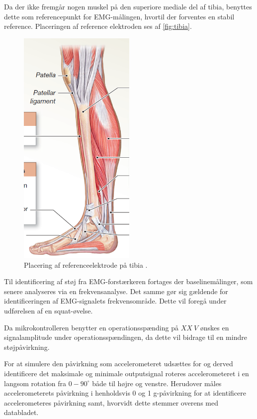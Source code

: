 Da der ikke fremgår nogen muskel på den superiore mediale del af tibia, benyttes dette som referencepunkt for EMG-målingen, hvortil der forventes en stabil reference. Placeringen af reference elektroden ses af \autoref{fig:tibia}.

\begin{figure}[H]
\centering
\includegraphics[width=0.5\textwidth]{figures/tibia.png}
\caption{Placering af referenceelektrode på tibia \citep{martini2012}.}
\label{fig:tibia}
\end{figure}

Til identificering af støj fra EMG-forstærkeren fortages der baselinemålinger, som senere analyseres via en frekvensanalyse. Det samme gør sig gældende for identificeringen af EMG-signalets frekvensområde. Dette vil foregå under udførelsen af en squat-øvelse.  

Da mikrokontrolleren benytter en operationsspænding på $XX~V$ ønskes en signalamplitude under operationsspændingen, da dette vil bidrage til en mindre støjpåvirkning. 

For at simulere den påvirkning som accelerometeret udsættes for og derved identificere det maksimale og minimale outputsignal roteres accelerometeret i en langsom rotation fra $0 - 90^{\circ}$ både til højre og venstre. Herudover måles accelerometerets påvirkning i henholdsvis 0 og 1 g-påvirkning for at identificere accelerometeres påvirkning samt, hvorvidt dette stemmer overens med databladet.


